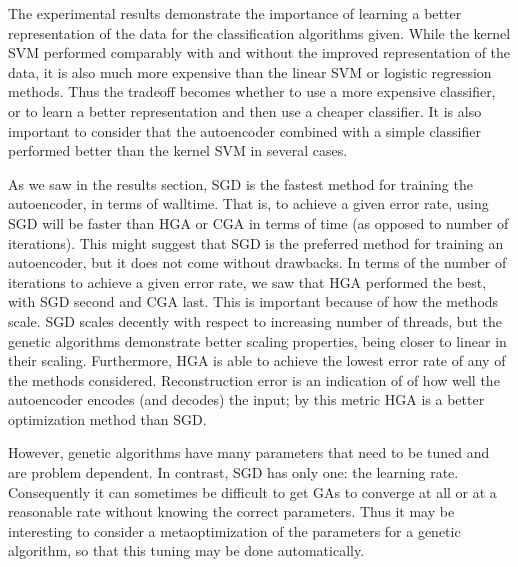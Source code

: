 The experimental results demonstrate the importance of learning a better representation of the data for the classification algorithms given. While the kernel SVM performed comparably with and without the improved representation of the data, it is also much more expensive than the linear SVM or logistic regression methods. Thus the tradeoff becomes whether to use a more expensive classifier, or to learn a better representation and then use a cheaper classifier. It is also important to consider that the autoencoder combined with a simple classifier performed better than the kernel SVM in several cases.

As we saw in the results section, SGD is the fastest method for training the autoencoder, in terms of walltime. That is, to achieve a given error rate, using SGD will be faster than HGA or CGA in terms of time (as opposed to number of iterations). This might suggest that SGD is the preferred method for training an autoencoder, but it does not come without drawbacks. In terms of the number of iterations to achieve a given error rate, we saw that HGA performed the best, with SGD second and CGA last. This is important because of how the methods scale. SGD scales decently with respect to increasing number of threads, but the genetic algorithms demonstrate better scaling properties, being closer to linear in their scaling. 
Furthermore, HGA is able to achieve the lowest error rate of any of the methods considered. Reconstruction error is an indication of of how well the autoencoder encodes (and decodes) the input; by this metric HGA is a better optimization method than SGD.

However, genetic algorithms have many parameters that need to be tuned and are problem dependent. In contrast, SGD has only one: the learning rate. Consequently it can sometimes be difficult to get GAs to converge at all or at a reasonable rate without knowing the correct parameters. Thus it may be interesting to consider a metaoptimization of the parameters for a genetic algorithm, so that this tuning may be done automatically. 

